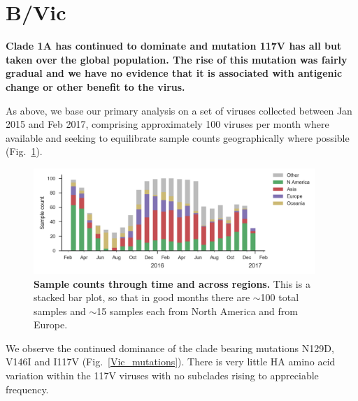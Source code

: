 \documentclass[11pt,oneside,letterpaper]{article}
\begin{document}
\clearpage
\pagebreak

\section*{B/Vic}

\textbf{Clade 1A has continued to dominate and mutation 117V has all but taken over the global population.
The rise of this mutation was fairly gradual and we have no evidence that it is associated with antigenic change or other benefit to the virus.}

As above, we base our primary analysis on a set of viruses collected between Jan 2015 and Feb 2017, comprising approximately 100 viruses per month where available and seeking to equilibrate sample counts geographically where possible (Fig.\ \ref{Vic_counts}).

\begin{figure}[H]
	\centering
	\includegraphics[width=0.95\textwidth]{../figures/feb-2017/Vic_counts.png}
	\caption{\textbf{Sample counts through time and across regions.}
	This is a stacked bar plot, so that in good months there are $\sim$100 total samples and $\sim$15 samples each from North America and from Europe.
	}
	\label{Vic_counts}
\end{figure}

\pagebreak

We observe the continued dominance of the clade bearing mutations N129D, V146I and I117V (Fig.\ \ref{Vic_mutations}).
There is very little HA amino acid variation within the 117V viruses with no subclades rising to appreciable frequency.
\end{document}
